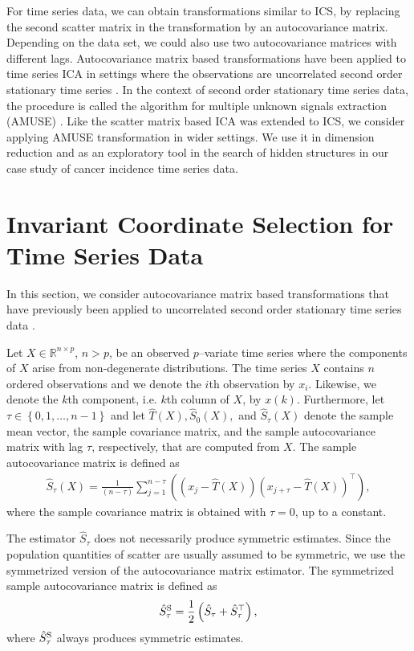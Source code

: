 \documentclass{llncs}
\begin{document}
For time series data, we can obtain transformations similar to ICS, by replacing the second scatter matrix in the transformation by an  autocovariance matrix.  Depending on the data set, we could also use two autocovariance matrices with different lags.  Autocovariance 
matrix based transformations have been applied to time series ICA in settings where the observations are
uncorrelated second order stationary time series \cite{Miettinen2012,Tong1990}.  In the context of second order stationary time series data, the procedure is called the algorithm for multiple unknown signals extraction (AMUSE) \cite{Tong1990}. Like the
scatter matrix based ICA was extended to ICS, we consider applying
AMUSE transformation in  wider settings.
We use it in dimension reduction and as an exploratory
tool in the search of hidden structures in our case study of cancer incidence time
series data. 

\section{Invariant Coordinate Selection for Time Series Data}\label{tics}
In this section, we consider autocovariance matrix based transformations that have previously been applied to uncorrelated second order stationary time series data \cite{Miettinen2012,Tong1990}.


Let $X\in \mathbb{R}^{n\times p}$, $n>p$, be an observed  $p$--variate time series where the components of $X$ arise from non-degenerate distributions. The time series $X$ contains $n$ ordered observations and we denote the $i$th observation by $x_i$. Likewise, we denote the $k$th component, i.e. $k$th column of $X$, by $x\left(k\right)$.  Furthermore, let $\tau \in \left\{0,1,\ldots,n-1\right\}$ and let $\hat{T}\left(X\right), \hat{S}_0\left(X\right),$ and $\hat{S}_{\tau}\left(X\right)$ denote the sample mean vector, the sample covariance matrix, and the sample autocovariance matrix with lag $\tau$, respectively, that are computed from  $X.$ The sample autocovariance matrix is defined as 
\begin{align*}
\hat{S}_{\tau}\left(X\right)=\frac{1}{\left(n -\tau\right)} \sum^{n-\tau}_{j=1}\left(\left(x_j - \hat{T}\left(X\right)\right)\left(x_{j+\tau} - \hat{T}\left(X\right)\right)^\top \right),
\end{align*}
where the sample covariance matrix is obtained with $\tau=0$, up to a constant. 

The estimator $\hat{S}_\tau$ does not necessarily produce symmetric estimates. Since the population quantities of scatter are usually assumed to be symmetric, we use the symmetrized version of the autocovariance matrix estimator. The symmetrized sample autocovariance matrix is defined as
\begin{align*}
\hat{S}_\tau^\textnormal{S} = \frac{1}{2} \left( \hat{S}_\tau + \hat{S}^\top_\tau \right),
\end{align*}
where $\hat{S}_\tau^\textnormal{S}$ always produces symmetric estimates.
\end{document}
